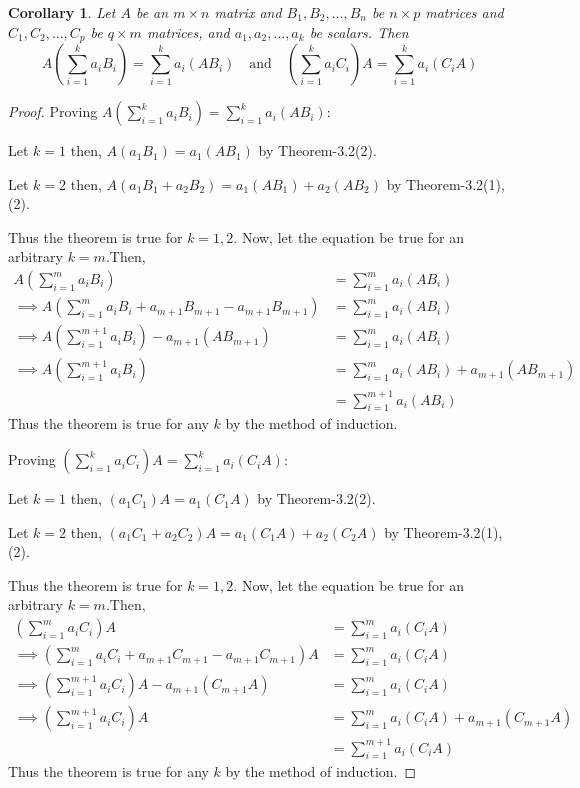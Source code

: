 \documentclass[12pt, a4paper]{article}
\newtheorem{corollary}{Corollary}[theorem]
\theoremstyle{definition}
\theoremstyle{remark}
\begin{document}
\begin{corollary}
    Let $A$ be an $ m \times n$ matrix and $B_1,B_2,\ldots,B_n$ be $n \times p$ matrices and $C_1,C_2,\ldots,C_p$ be $q \times m$ matrices, and $a_1,a_2,\ldots,a_k$ be scalars. Then
    \[
    A\left(\sum_{i=1}^k a_iB_i\right) = \sum_{i=1}^k a_i(AB_i) \quad \text{and} \quad \left(\sum_{i=1}^k a_iC_i\right)A = \sum_{i=1}^k a_i(C_iA)
    \]
\end{corollary}

\begin{proof}
    Proving $A\left(\displaystyle\sum_{i=1}^k a_iB_i\right) = \displaystyle\sum_{i=1}^k a_i(AB_i)$:

    \noindent Let $k = 1$ then, $A(a_1B_1)=a_1(AB_1)$ by Theorem-3.2(2).

    \noindent Let $k=2$ then, $A(a_1B_1+a_2B_2)=a_1(AB_1)+a_2(AB_2)$ by Theorem-3.2(1),(2). 

    \noindent Thus the theorem is true for $k=1,2$. Now, let the equation be true for an arbitrary $k=m$.Then,
    \begin{align*}
        A\left(\sum_{i=1}^m a_iB_i\right) &= \sum_{i=1}^m a_i(AB_i)\\
        \implies A\left(\sum_{i=1}^m a_iB_i + a_{m+1}B_{m+1}-a_{m+1}B_{m+1}\right) &= \sum_{i=1}^m a_i(AB_i) \\
        \implies A\left(\sum_{i=1}^{m+1} a_iB_i\right) - a_{m+1}(AB_{m+1}) &= \sum_{i=1}^m a_i(AB_i)\\
        \implies A\left(\sum_{i=1}^{m+1} a_iB_i\right) &= \sum_{i=1}^m a_i(AB_i) + a_{m+1}(AB_{m+1})\\
        &= \sum_{i=1}^{m+1} a_i(AB_i)
    \end{align*}
    Thus the theorem is true for any $k$ by the method of induction.

    \vspace{0.5cm}

    \noindent Proving $\left(\displaystyle\sum_{i=1}^k a_iC_i\right)A = \displaystyle\sum_{i=1}^k a_i(C_iA)$:

    \noindent Let $k = 1$ then, $(a_1C_1)A=a_1(C_1A)$ by Theorem-3.2(2).

    \noindent Let $k=2$ then, $(a_1C_1+a_2C_2)A=a_1(C_1A)+a_2(C_2A)$ by Theorem-3.2(1),(2). 

    \noindent Thus the theorem is true for $k=1,2$. Now, let the equation be true for an arbitrary $k=m$.Then,
    \begin{align*}
        \left(\sum_{i=1}^m a_iC_i\right)A &= \sum_{i=1}^m a_i(C_iA)\\
        \implies \left(\sum_{i=1}^m a_iC_i + a_{m+1}C_{m+1}-a_{m+1}C_{m+1}\right)A &= \sum_{i=1}^m a_i(C_iA) \\
        \implies \left(\sum_{i=1}^{m+1} a_iC_i\right)A - a_{m+1}(C_{m+1}A) &= \sum_{i=1}^m a_i(C_iA)\\
        \implies \left(\sum_{i=1}^{m+1} a_iC_i\right)A &= \sum_{i=1}^m a_i(C_iA) + a_{m+1}(C_{m+1}A)\\
        &= \sum_{i=1}^{m+1} a_i(C_iA)
    \end{align*}
    Thus the theorem is true for any $k$ by the method of induction.
\end{proof}
\end{document}
